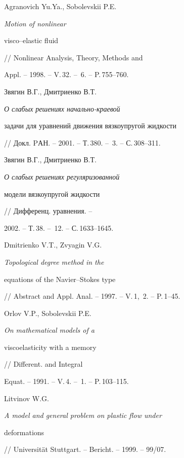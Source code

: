 \begin{thebibliography}{}







Agranovich Yu.Ya., Sobolevskii P.E. {\em Motion of nonlinear


visco--elastic fluid} // Nonlinear Analysis, Theory, Methods and


Appl. -- 1998. -- V.\,32. -- \No\,6. -- P.\,755--760.







Звягин В.Г., Дмитриенко В.Т. {\em О слабых решениях начально-краевой


задачи для уравнений движения вязкоупругой жидкости}


// Докл. PАН. -- 2001. -- Т.\,380. -- \No\,3. -- С.\,308--311.







Звягин В.Г., Дмитриенко В.Т. {\em О слабых решениях регуляризованной


модели вязкоупругой жидкости} // Дифференц. уравнения. --


2002. -- Т.\,38. -- \No\,12. -- С.\,1633--1645.







Dmitrienko V.T., Zvyagin V.G. {\em Topological degree method in the


equations of the Navier--Stokes type}


// Abstract and Appl. Anal. -- 1997. -- V.\,1,~2. -- P.\,1--45.







Orlov V.P., Sobolevskii P.E. {\em On mathematical models of a


viscoelasticity with a memory} // Different. and Integral 


Equat. -- 1991. -- V.\,4. -- \No\,1. -- P.\,103--115.







Litvinov W.G. {\em A model and general problem on plastic flow under


deformations} // Universit\"at Stuttgart. -- Bericht. -- 1999. -- 99/07.



\end{thebibliography}
